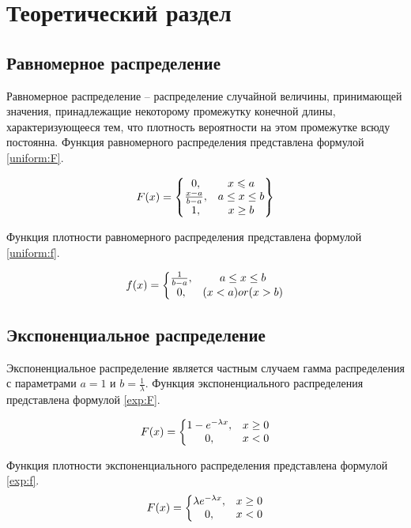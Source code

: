 \chapter{Теоретический раздел}

\section{Равномерное распределение}

Равномерное распределение -- распределение случайной величины, принимающей значения, принадлежащие некоторому промежутку конечной длины, характеризующееся тем, что плотность вероятности на этом промежутке всюду постоянна. Функция равномерного распределения представлена формулой \ref{uniform:F}.

\begin{equation}\label{uniform:F}
F(x) = \begin{Bmatrix}
$$
	0, & x\leqslant a \\
	\frac{x - a}{b - a}, & a\leq x\leq b \\
	1, & x\geq b
$$
\end{Bmatrix}
\end{equation}

Функция плотности равномерного распределения представлена формулой \ref{uniform:f}.

\begin{equation}\label{uniform:f}
f(x) = \left\{\begin{matrix}
$$
	\frac{1}{b - a}, & a\leq x\leq b \\
	0, & (x < a) or (x > b)
$$
\end{matrix}\right.
\end{equation}

\section{Экспоненциальное распределение}

Экспоненциальное распределение является частным случаем гамма распределения с параметрами $a = 1$ и  $b = \frac{1}{\lambda}$.
Функция экспоненциального распределения представлена формулой \ref{exp:F}.

\begin{equation}\label{exp:F}
F(x) = \left\{\begin{matrix}
$$
1 - e^{-\lambda x}, & x \geq 0 \\
0, & x < 0
$$
\end{matrix}\right.
\end{equation} 

Функция плотности экспоненциального распределения представлена формулой \ref{exp:f}.
\begin{equation}\label{exp:f}
F(x) = \left\{\begin{matrix}
$$
\lambda e^{-\lambda x}, & x \geq 0 \\
0, & x < 0
$$
\end{matrix}\right.
\end{equation}

